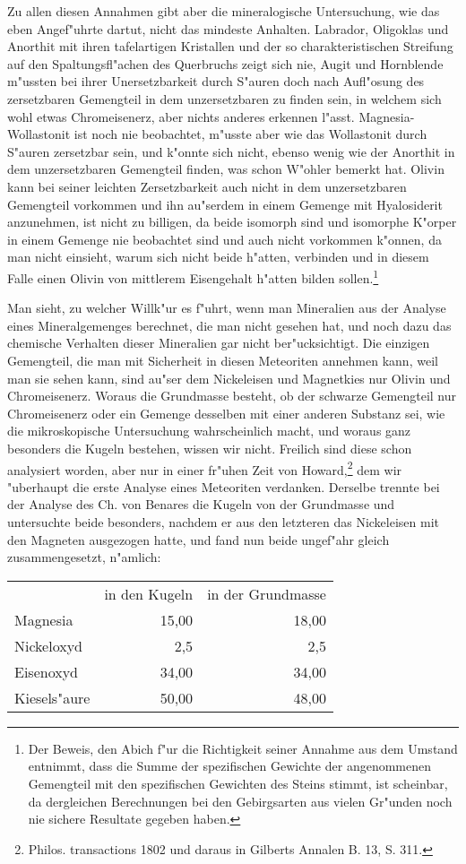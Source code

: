 \documentclass[a4paper, 11pt, oneside]{article}
\begin{document}
Zu allen diesen Annahmen gibt aber die mineralogische Untersuchung, wie das eben Angef"uhrte dartut, nicht das mindeste Anhalten. Labrador, Oligoklas und Anorthit mit ihren tafelartigen Kristallen und der so charakteristischen Streifung auf den Spaltungsfl"achen des Querbruchs zeigt sich nie, Augit und Hornblende m"ussten bei ihrer Unersetzbarkeit durch S"auren doch nach Aufl"osung des zersetzbaren Gemengteil in dem unzersetzbaren zu finden sein, in welchem sich wohl etwas Chromeisenerz, aber nichts anderes erkennen l"asst. Magnesia- Wollastonit ist noch nie beobachtet, m"usste aber wie das Wollastonit durch S"auren zersetzbar sein, und k"onnte sich nicht, ebenso wenig wie der Anorthit in dem unzersetzbaren Gemengteil finden, was schon W"ohler bemerkt hat. Olivin kann bei seiner leichten Zersetzbarkeit auch nicht in dem unzersetzbaren Gemengteil vorkommen und ihn au"serdem in einem Gemenge mit Hyalosiderit anzunehmen, ist nicht zu billigen, da beide isomorph sind und isomorphe K"orper in einem Gemenge nie beobachtet sind und auch nicht vorkommen k"onnen, da man nicht einsieht, warum sich nicht beide h"atten, verbinden und in diesem Falle einen Olivin von mittlerem Eisengehalt h"atten bilden sollen.\footnote{Der Beweis, den Abich f"ur die Richtigkeit seiner Annahme aus dem Umstand entnimmt, dass die Summe der spezifischen Gewichte der angenommenen Gemengteil mit den spezifischen Gewichten des Steins stimmt, ist scheinbar, da dergleichen Berechnungen bei den Gebirgsarten aus vielen Gr"unden noch nie sichere Resultate gegeben haben.}

Man sieht, zu welcher Willk"ur es f"uhrt, wenn man Mineralien aus der Analyse eines Mineralgemenges berechnet, die man nicht gesehen hat, und noch dazu das chemische Verhalten dieser Mineralien gar nicht ber"ucksichtigt. Die einzigen Gemengteil, die man mit Sicherheit in diesen Meteoriten annehmen kann, weil man sie sehen kann, sind au"ser dem Nickeleisen und Magnetkies nur Olivin und Chromeisenerz. Woraus die Grundmasse besteht, ob der schwarze Gemengteil nur Chromeisenerz oder ein Gemenge desselben mit einer anderen Substanz sei, wie die mikroskopische Untersuchung wahrscheinlich macht, und woraus ganz besonders die Kugeln bestehen, wissen wir nicht. Freilich sind diese schon analysiert worden, aber nur in einer fr"uhen Zeit von Howard,\footnote{Philos. transactions 1802 und daraus in Gilberts Annalen B. 13, S. 311.} dem wir "uberhaupt die erste Analyse eines Meteoriten verdanken. Derselbe trennte bei der Analyse des Ch. von Benares die Kugeln von der Grundmasse und untersuchte beide besonders, nachdem er aus den letzteren das Nickeleisen mit den Magneten ausgezogen hatte, und fand nun beide ungef"ahr gleich zusammengesetzt, n"amlich:
\begin{center}
\begin{tabular}{ l r r }
     & in den Kugeln & in der Grundmasse\\
    Magnesia & 15,00 & 18,00\\
    Nickeloxyd & 2,5 & 2,5\\
    Eisenoxyd & 34,00 & 34,00\\
    Kiesels"aure & 50,00 & 48,00\\
\end{tabular}
\end{center}
\end{document}
